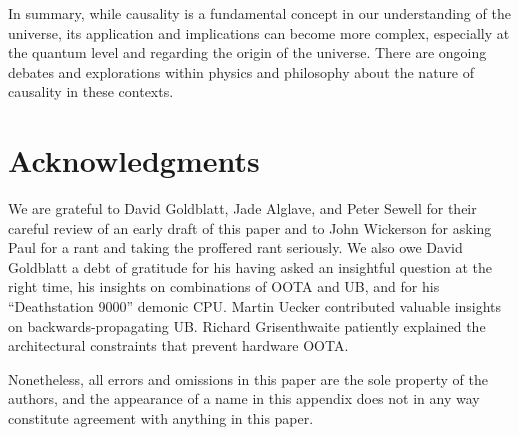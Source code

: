 \documentclass[10]{article}
\begin{document}
In summary, while causality is a fundamental concept in our understanding
of the universe, its application and implications can become more complex,
especially at the quantum level and regarding the origin of the universe.
There are ongoing debates and explorations within physics and philosophy
about the nature of causality in these contexts.


\clearpage

\section{Acknowledgments}
\label{sec:Acknowledgments}

We are grateful to David Goldblatt, Jade Alglave, and Peter
Sewell for their careful review of an early draft of this paper and
to John Wickerson for asking Paul for a rant and taking the proffered
rant seriously.
We also owe David Goldblatt a debt of gratitude for his having asked an
insightful question at the right time, his insights on combinations of
OOTA and UB, and for his ``Deathstation 9000'' demonic CPU.
Martin Uecker contributed valuable insights on backwards-propagating UB.
Richard Grisenthwaite patiently explained the architectural constraints
that prevent hardware OOTA.

Nonetheless, all errors and omissions in this paper are the sole property
of the authors, and the appearance of a name in this appendix does
not in any way constitute agreement with anything in this paper.

\end{document}
